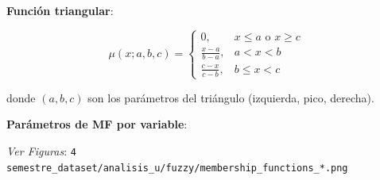 \documentclass[12pt,letterpaper,twoside]{report}
\begin{document}
\begin{calculobox}
\textbf{Función triangular}:

\begin{equation}
\mu(x; a, b, c) = 
\begin{cases}
0, & x \leq a \text{ o } x \geq c \\
\frac{x-a}{b-a}, & a < x < b \\
\frac{c-x}{c-b}, & b \leq x < c
\end{cases}
\end{equation}

donde $(a, b, c)$ son los parámetros del triángulo (izquierda, pico, derecha).

\textbf{Parámetros de MF por variable}:

\begin{table}[H]
\centering
\caption{Parámetros de Funciones de Pertenencia (Percentiles)}
\label{tab:mf_params}
\end{table}
\end{calculobox}

\textit{Ver Figuras}: \texttt{4 semestre\_dataset/analisis\_u/fuzzy/membership\_functions\_*.png}
\end{document}
